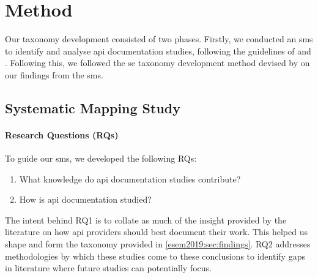 \section{Method}
\label{esem2019:sec:method}

Our taxonomy development consisted of two phases. Firstly, we conducted an \gls{sms} to identify and analyse \gls{api} documentation studies, following the guidelines of \citet{Kitchenham:2007dd} and \citet{Petersen:2008td}. Following this, we followed the \gls{se} taxonomy development method devised by \citet{Usman:2017hn} on our findings from the \gls{sms}.

\subsection{Systematic Mapping Study}
\label{esem2019:sec:method:lit-review}

\paragraph{Research Questions (RQs)}

To guide our \gls{sms}, we developed the following RQs:

\begin{framed}
\begin{enumerate}[leftmargin=2\parindent,label=\textbf{RQ\arabic*}]
  \item What knowledge do \gls{api} documentation studies contribute?
  \item How is \gls{api} documentation studied?
\end{enumerate}
\end{framed}

The intent behind RQ1 is to collate as much of the insight provided by the literature on how \gls{api} providers should best document their work. This helped us shape and form the taxonomy provided in \cref{esem2019:sec:findings}. RQ2 addresses methodologies by which these studies come to these conclusions to identify gaps in literature where future studies can potentially focus.


